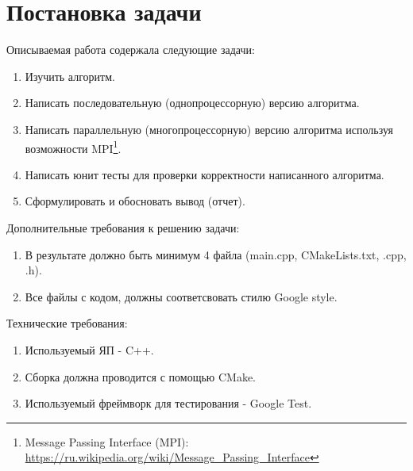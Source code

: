 \section*{Постановка задачи}

Описываемая работа содержала следующие задачи:
\begin{enumerate}
    \item Изучить алгоритм.
    \item Написать последовательную (однопроцессорную) версию алгоритма.
    \item Написать параллельную (многопроцессорную) версию алгоритма используя возможности MPI\footnote{Message Passing Interface (MPI): \url{https://ru.wikipedia.org/wiki/Message_Passing_Interface} }.
    \item Написать юнит тесты для проверки корректности написанного алгоритма.
    \item Сформулировать и обосновать вывод (отчет).
\end{enumerate}

Дополнительные требования к решению задачи:
\begin{enumerate}
     \item В результате должно быть минимум 4 файла (main.cpp, CMakeLists.txt, .cpp, .h).
     \item Все файлы с кодом, должны соответсвовать стилю Google style.
\end{enumerate}

Технические требования:
\begin{enumerate}
    \item Используемый ЯП - C++.
    \item Сборка должна проводится с помощью CMake.
    \item Используемый фреймворк для тестирования - Google Test.
\end{enumerate}


